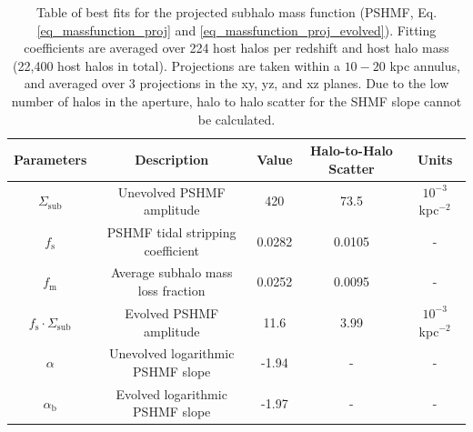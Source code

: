 \documentclass[%
 reprint,
 amsmath,
 amssymb,
 aps,
prd,
twocolumn,
superscriptaddress,
preprintnumbers,
floatfix,
nofootinbib
]{revtex4-2}
\begin{document}
\begin{table}

 \begin{tabular}{ccccc}
  \hline
    Parameters               & Description & Value     & Halo-to-Halo Scatter      & Units                     \\
  \hline
    $\Sigma_{\mathrm{sub}}$           & Unevolved PSHMF amplitude          & 420       & 73.5                      & $10^{-3}$ kpc$^{-2}$                \\
    $f_{\mathrm{s}}$                  & PSHMF tidal stripping coefficient     & 0.0282    & 0.0105                    & -                         \\
    $f_{\mathrm{m}}$                  & Average subhalo mass loss fraction     & 0.0252    & 0.0095  & -                         \\
    $f_{\mathrm{s}} \cdot \Sigma_{\mathrm{sub}}$ & Evolved PSHMF amplitude            &11.6      & 3.99                      & $10^{-3}$ kpc$^{-2}$                \\
    $\alpha$                 & Unevolved logarithmic PSHMF slope  &-1.94    & -                         & -                         \\
    $\alpha_{\mathrm{b}}$               & Evolved logarithmic PSHMF slope    &-1.97    & -                         & -                         \\
    \hline
  \end{tabular}
  \caption{
        Table of best fits for the projected subhalo mass function (PSHMF, Eq. \ref{eq_massfunction_proj} and \ref{eq_massfunction_proj_evolved}).
        Fitting coefficients are averaged over 224 host halos per redshift and host halo mass (22,400 host halos in total).
        Projections are taken within a $10-20$ kpc annulus, and averaged over 3 projections in the xy, yz, and xz planes.
        Due to the low number of halos in the aperture, halo to halo scatter for the SHMF slope cannot be calculated.
 }
 \label{tab_fits}

\end{table}
\end{document}

